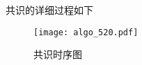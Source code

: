 \documentclass[12pt, UTF8]{article}
\begin{document}
\begin{comment}
\item Tx共识+上一轮的执行结果共识。流水线处理，共识和执行相对独立，执行落后共识一个成块周期。不会减少延时，但是可以做到在同一时间点上可以并行处理共识和执行。缺点在于，会将非法交易打包成块，浪费区块存储。
\item (tx提议 + voter执行 + voter以执行结果hash响应+对执行结果投票)，延时也可以做到最小。 优点在于可以避免打包非法交易， 同时识别出哪些交易批没有deterministic地执行，因为这些交易批收集不到足够多的票数。从经济学博弈的角度，提议者为了获得激励，不会故意提交non-deterministic的程序。
\end{itemize}
我们的共识采用第三种方式，主要是考虑到方便上层智能合约的设计。
\end{comment}

共识的详细过程如下

\begin{figure}[!thb]
\centering
    \texttt{[image: algo\_520.pdf]}
    \caption{共识时序图}
    \label{fig:consensus}
\end{figure}
\end{document}
